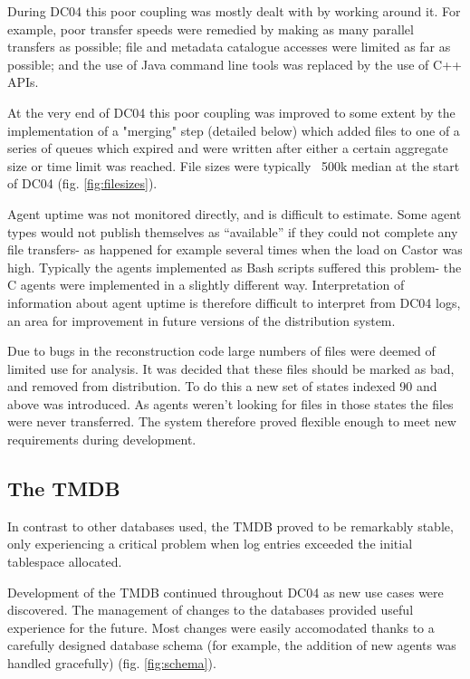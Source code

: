 \documentclass{cmspaper}
\begin{document}
During DC04 this poor coupling was mostly dealt with by working around
it. For example, poor transfer speeds were remedied by making as many
parallel transfers as possible; file and metadata catalogue accesses
were limited as far as possible; and the use of Java command line
tools was replaced by the use of C++ APIs.

At the very end of DC04 this poor coupling was improved to some extent
by the implementation of a "merging" step (detailed below) which added
files to one of a series of queues which expired and were written
after either a certain aggregate size or time limit was reached. File
sizes were typically ~500k median at the start of DC04
(fig. \ref{fig:filesizes}).

Agent uptime was not monitored directly, and is difficult to
estimate. Some agent types would not publish themselves as
``available'' if they could not complete any file transfers- as
happened for example several times when the load on Castor was
high. Typically the agents implemented as Bash scripts suffered this
problem- the C agents were implemented in a slightly different way.
Interpretation of information about agent uptime is therefore
difficult to interpret from DC04 logs, an area for improvement in
future versions of the distribution system.

Due to bugs in the reconstruction code large numbers of files were
deemed of limited use for analysis. It was decided that these files
should be marked as bad, and removed from distribution. To do this a
new set of states indexed 90 and above was introduced. As agents
weren't looking for files in those states the files were never
transferred. The system therefore proved flexible enough to meet new
requirements during development.

\subsection{The TMDB}
In contrast to other databases used, the TMDB proved to be remarkably
stable, only experiencing a critical problem when log entries exceeded
the initial tablespace allocated.

Development of the TMDB continued throughout DC04 as new use cases
were discovered. The management of changes to the databases provided
useful experience for the future. Most changes were easily accomodated
thanks to a carefully designed database schema (for example, the
addition of new agents was handled gracefully)
(fig. \ref{fig:schema}).
\end{document}
